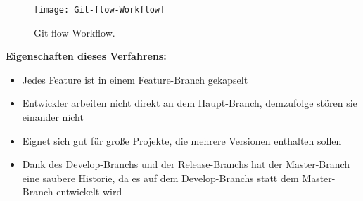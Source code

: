 \begin{figure}[H]
	\centering
	\texttt{[image: Git-flow-Workflow]}
	\caption[Git-flow-Workflow]{Git-flow-Workflow.\\ \cite{Git-flow-Workflow}}
	\label{fig:Git-flow-Workflow}
\end{figure}
	
\textbf{Eigenschaften dieses Verfahrens:}
\begin{itemize}
	\item Jedes Feature ist in einem Feature-Branch gekapselt
	\item Entwickler arbeiten nicht direkt an dem Haupt-Branch, demzufolge stören sie einander nicht
	\item Eignet sich gut für große Projekte, die mehrere Versionen enthalten sollen
	\item Dank des Develop-Branchs und der Release-Branchs hat der Master-Branch eine saubere Historie, da es auf dem Develop-Branchs statt dem Master-Branch entwickelt wird
\end{itemize}

